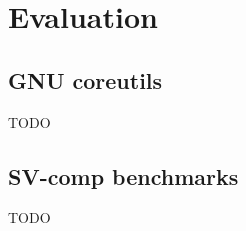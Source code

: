 \section{Evaluation}
\label{sec:eval}

  \subsection{GNU coreutils}
  \label{sec:eval:coreutils}
  TODO

  \subsection{SV-comp benchmarks}
  \label{sec:eval:sv-comp}
  TODO